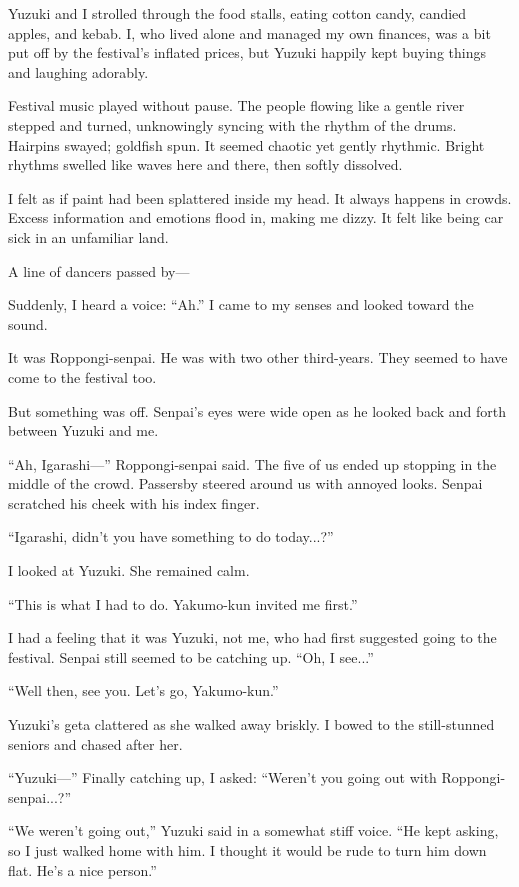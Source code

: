 \documentclass[
    a4paper,
    12pt,
    twoside,
    openany,
    UTF8,
    fontset=windows
]{ctexbook}
\begin{document}
Yuzuki and I strolled through the food stalls, eating cotton candy, candied apples, and kebab. I, who lived alone and managed my own finances, was a bit put off by the festival's inflated prices, but Yuzuki happily kept buying things and laughing adorably.

Festival music played without pause. The people flowing like a gentle river stepped and turned, unknowingly syncing with the rhythm of the drums. Hairpins swayed; goldfish spun. It seemed chaotic yet gently rhythmic. Bright rhythms swelled like waves here and there, then softly dissolved.

I felt as if paint had been splattered inside my head. It always happens in crowds. Excess information and emotions flood in, making me dizzy. It felt like being car sick in an unfamiliar land.

A line of dancers passed by---

Suddenly, I heard a voice: ``Ah.'' I came to my senses and looked toward the sound.

It was Roppongi-senpai. He was with two other third-years. They seemed to have come to the festival too.

But something was off. Senpai's eyes were wide open as he looked back and forth between Yuzuki and me.

``Ah, Igarashi---'' Roppongi-senpai said. The five of us ended up stopping in the middle of the crowd. Passersby steered around us with annoyed looks. Senpai scratched his cheek with his index finger.

``Igarashi, didn't you have something to do today...?''

I looked at Yuzuki. She remained calm.

``This is what I had to do. Yakumo-kun invited me first.''

I had a feeling that it was Yuzuki, not me, who had first suggested going to the festival. Senpai still seemed to be catching up. ``Oh, I see...''

``Well then, see you. Let's go, Yakumo-kun.''

Yuzuki's geta clattered as she walked away briskly. I bowed to the still-stunned seniors and chased after her.

``Yuzuki---'' Finally catching up, I asked: ``Weren't you going out with Roppongi-senpai...?''

``We weren't going out,'' Yuzuki said in a somewhat stiff voice. ``He kept asking, so I just walked home with him. I thought it would be rude to turn him down flat. He's a nice person.''
\end{document}
